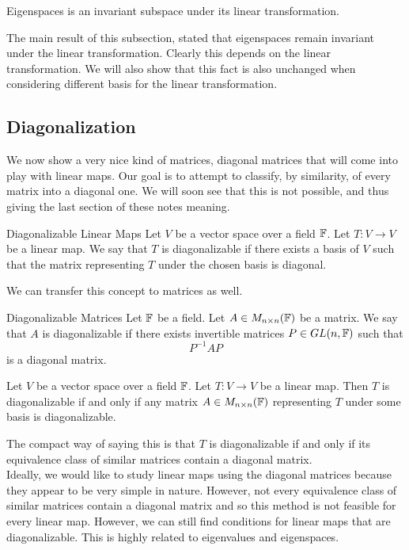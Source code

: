 \documentclass[a4paper]{article}
\begin{document}
\begin{thm}{}{} Eigenspaces is an invariant subspace under its linear transformation. 
\end{thm}

The main result of this subsection, stated that eigenspaces remain invariant under the linear transformation. Clearly this depends on the linear transformation. We will also show that this fact is also unchanged when considering different basis for the linear transformation. 

\subsection{Diagonalization}
We now show a very nice kind of matrices, diagonal matrices that will come into play with linear maps. Our goal is to attempt to classify, by similarity, of every matrix into a diagonal one. We will soon see that this is not possible, and thus giving the last section of these notes meaning. 

\begin{defn}{Diagonalizable Linear Maps}{} Let $V$ be a vector space over a field $\mathbb{F}$. Let $T:V\to V$ be a linear map. We say that $T$ is diagonalizable if there exists a basis of $V$ such that the matrix representing $T$ under the chosen basis is diagonal. 
\end{defn}

We can transfer this concept to matrices as well. 

\begin{defn}{Diagonalizable Matrices}{} Let $\mathbb{F}$ be a field. Let $A\in M_{n\times n}(\mathbb{F})$ be a matrix. We say that $A$ is diagonalizable if there exists invertible matrices $P\in GL(n,\mathbb{F})$ such that $$P^{-1}AP$$ is a diagonal matrix. 
\end{defn}

\begin{lmm}{}{} Let $V$ be a vector space over a field $\mathbb{F}$. Let $T:V\to V$ be a linear map. Then $T$ is diagonalizable if and only if any matrix $A\in M_{n\times n}(\mathbb{F})$ representing $T$ under some basis is diagonalizable. 
\end{lmm}

The compact way of saying this is that $T$ is diagonalizable if and only if its equivalence class of similar matrices contain a diagonal matrix. \\

Ideally, we would like to study linear maps using the diagonal matrices because they appear to be very simple in nature. However, not every equivalence class of similar matrices contain a diagonal matrix and so this method is not feasible for every linear map. However, we can still find conditions for linear maps that are diagonalizable. This is highly related to eigenvalues and eigenspaces. 
\end{document}
